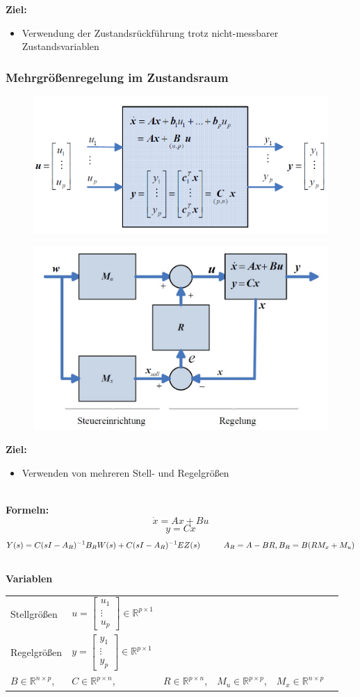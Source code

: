 \documentclass[10pt,a4paper]{article}
\newcommand{\tab}[1][1]{\hspace*{#1cm}}
\newcommand{\vect}[1]{\ensuremath{\begin{bmatrix}#1\end{bmatrix}}}
\begin{document}
\textbf{Ziel:}
\begin{itemize}
	\item Verwendung der Zustandsrückführung trotz nicht-messbarer Zustandsvariablen
\end{itemize}

\subsubsection{Mehrgrößenregelung im Zustandsraum}
\begin{figure}[H]
	\includegraphics[width=0.7\columnwidth]{imgs/abb7_14.png}
\end{figure}
\begin{figure}[H]
	\includegraphics[width=0.7\columnwidth]{imgs/abb7_15.png}
\end{figure}

\textbf{Ziel:}
\begin{itemize}
	\item Verwenden von mehreren Stell- und Regelgrößen
\end{itemize} ~\\

\textbf{Formeln:}
$$
	\dot x = Ax + Bu
$$
$$
	y = Cx
$$ 
$$
	Y(s) = C(sI-A_R)^{-1} B_R W(s) + C(sI-A_R)^{-1} E Z(s) \tab A_R = A - BR, B_R = B(RM_x + M_u)
$$~\\

\textbf{Variablen} ~\\
\begin{tabularx}{\columnwidth}{llllll}
	Stellgrößen & $u = \vect{u_1 \\ \vdots \\ u_p} \in \mathbb{R}^{p \times 1}$ \\
	Regelgrößen & $y = \vect{y_1 \\ \vdots \\ y_p} \in \mathbb{R}^{p \times 1}$ \\
	 $B \in \mathbb{R}^{n \times p}$, 
	 & $C \in \mathbb{R}^{p \times n}$, 
	 & $R \in \mathbb{R}^{p \times n}$, 
	 & $M_u \in \mathbb{R}^{p \times p}$, 
	 & $M_x \in \mathbb{R}^{n \times p}$
\end{tabularx} ~\\
\end{document}
